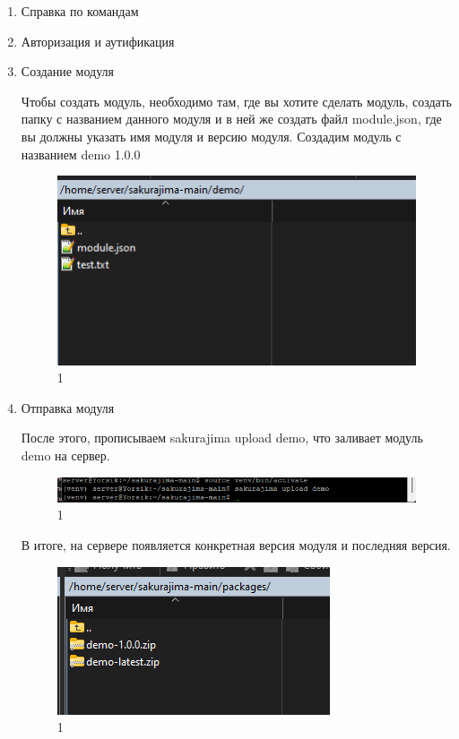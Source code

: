 \begin{enumerate}

\item Справка по командам


\item Авторизация и аутификация


\item Создание модуля

Чтобы создать модуль, необходимо там, где вы хотите сделать модуль, создать папку с названием данного модуля и в ней же создать файл module.json, где вы должны указать имя модуля и версию модуля. Создадим модуль с названием demo 1.0.0

\begin{figure}
  \centering
  \includegraphics[width=.6\textwidth]{graphics/test/demo_r.png}
  \caption{1}
  \label{fig:test1}
\end{figure}
\newpage
    \item Отправка модуля

После этого, прописываем sakurajima upload demo, что заливает модуль demo на сервер.

\begin{figure}
  \centering
  \includegraphics[width=1.0\textwidth]{graphics/test/demo.png}
  \caption{1}
  \label{fig:test1}
\end{figure}

В итоге, на сервере появляется конкретная версия модуля и последняя версия.

\begin{figure}
  \centering
  \includegraphics[width=.7\textwidth]{graphics/test/demo_alias_modules.png}
  \caption{1}
  \label{fig:test1}
\end{figure}


\end{enumerate}
